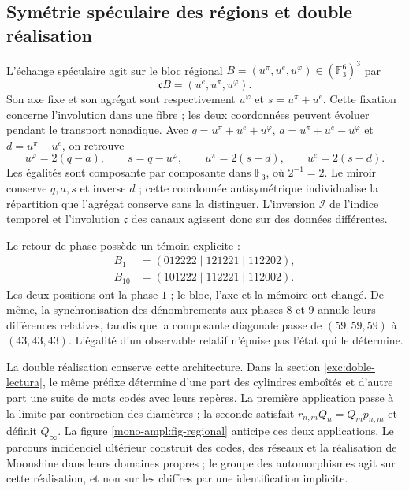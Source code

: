 \subsection{Symétrie spéculaire des régions et double réalisation}
\label{mono-ampl:regiones}

L'échange spéculaire agit sur le bloc régional
\(B=(u^\pi,u^e,u^\varphi)\in(\mathbb F_3^6)^3\) par
\[
 \mathfrak cB=(u^e,u^\pi,u^\varphi).
\]
Son axe fixe et son agrégat sont respectivement \(u^\varphi\) et
\(s=u^\pi+u^e\). Cette fixation concerne l'involution dans une fibre ;
les deux coordonnées peuvent évoluer pendant le transport nonadique.
Avec \(q=u^\pi+u^e+u^\varphi\),
\(a=u^\pi+u^e-u^\varphi\) et \(d=u^\pi-u^e\), on retrouve
\[
 u^\varphi=2(q-a),\qquad s=q-u^\varphi,\qquad
 u^\pi=2(s+d),\qquad u^e=2(s-d).
\]
Les égalités sont composante par composante dans \(\mathbb F_3\), où
\(2^{-1}=2\). Le miroir conserve \(q,a,s\) et inverse \(d\) ; cette
coordonnée antisymétrique individualise la répartition que l'agrégat conserve
sans la distinguer. L'inversion \(\mathcal I\) de l'indice temporel et
l'involution \(\mathfrak c\) des canaux agissent donc sur des
données différentes.

Le retour de phase possède un témoin explicite :
\[
 \begin{aligned}
 B_1&=(012222\mid121221\mid112202),\\
 B_{10}&=(101222\mid112221\mid112002).
 \end{aligned}
\]
Les deux positions ont la phase \(1\) ; le bloc, l'axe et la mémoire ont
changé. De même, la synchronisation des dénombrements aux phases \(8\) et
\(9\) annule leurs différences relatives, tandis que la composante diagonale
passe de \((59,59,59)\) à \((43,43,43)\). L'égalité d'un observable
relatif n'épuise pas l'état qui le détermine.

La double réalisation conserve cette architecture. Dans la section
\ref{exc:doble-lectura}, le même préfixe détermine d'une part des cylindres
emboîtés et d'autre part une suite de mots codés avec leurs repères.
La première application passe à la limite par contraction des diamètres ; la seconde
satisfait \(r_{n,m}Q_n=Q_mp_{n,m}\) et définit \(Q_\infty\).
La figure \ref{mono-ampl:fig-regional} anticipe ces deux applications.
Le parcours incidenciel ultérieur construit des codes, des réseaux et la
réalisation de Moonshine dans leurs domaines propres ; le groupe des automorphismes
agit sur cette réalisation, et non sur les chiffres par une identification
implicite.

